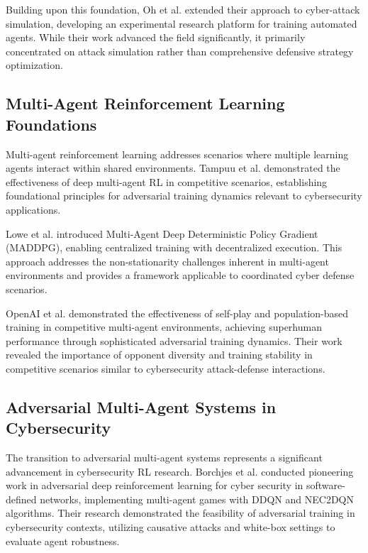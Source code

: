 \documentclass[12pt,oneside]{article}
\begin{document}
Building upon this foundation, Oh et al. \cite{oh2024employing} extended their approach to cyber-attack simulation, developing an experimental research platform for training automated agents. While their work advanced the field significantly, it primarily concentrated on attack simulation rather than comprehensive defensive strategy optimization.

\subsection{Multi-Agent Reinforcement Learning Foundations}

Multi-agent reinforcement learning addresses scenarios where multiple learning agents interact within shared environments. Tampuu et al. \cite{tampuu2017multiagent} demonstrated the effectiveness of deep multi-agent RL in competitive scenarios, establishing foundational principles for adversarial training dynamics relevant to cybersecurity applications.

Lowe et al. \cite{lowe2017multi} introduced Multi-Agent Deep Deterministic Policy Gradient (MADDPG), enabling centralized training with decentralized execution. This approach addresses the non-stationarity challenges inherent in multi-agent environments and provides a framework applicable to coordinated cyber defense scenarios.

OpenAI et al. \cite{openai2019dota} demonstrated the effectiveness of self-play and population-based training in competitive multi-agent environments, achieving superhuman performance through sophisticated adversarial training dynamics. Their work revealed the importance of opponent diversity and training stability in competitive scenarios similar to cybersecurity attack-defense interactions.

\subsection{Adversarial Multi-Agent Systems in Cybersecurity}

The transition to adversarial multi-agent systems represents a significant advancement in cybersecurity RL research. Borchjes et al. \cite{borchjes2023adversarial} conducted pioneering work in adversarial deep reinforcement learning for cyber security in software-defined networks, implementing multi-agent games with DDQN and NEC2DQN algorithms. Their research demonstrated the feasibility of adversarial training in cybersecurity contexts, utilizing causative attacks and white-box settings to evaluate agent robustness.
\end{document}
